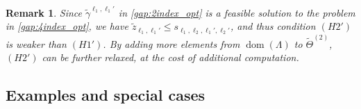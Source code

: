 \documentclass[aap,preprint]{imsart}
\theoremstyle{plain}
\newtheorem{remark}{Remark}[section]
\theoremstyle{definition}
\begin{document}
\begin{remark}\label{remark:gap_weaker}
Since $\tilde{\gamma}^{\ell_1,\ell_1'}$ in \eqref{gap:2index_opt} is a feasible solution to the problem in \eqref{gap:4index_opt}, we have $\tilde{z}_{\ell_1,\ell_1'} \leq s_{\ell_1,\ell_2,\ell_1',\ell_2'}$, and thus 
condition $(H2')$ is weaker than $(H1')$. By adding more elements from $\operatorname{dom}(\Lambda)$ to $\widetilde{\Theta}^{(2)}$,  $(H2')$ can be further relaxed, at the cost of additional computation. 
\end{remark}

\subsection{Examples and special cases} \label{subsec:gap_examples}
\end{document}
